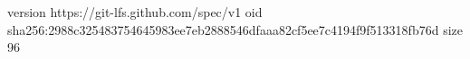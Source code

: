version https://git-lfs.github.com/spec/v1
oid sha256:2988c325483754645983ee7eb2888546dfaaa82cf5ee7c4194f9f513318fb76d
size 96
